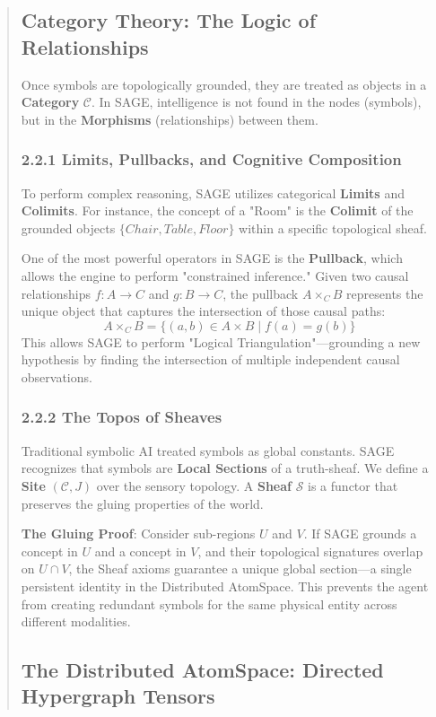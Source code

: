\documentclass[10pt,twocolumn,letterpaper]{article}
\begin{document}
\begin{abstract}
\subsection{Category Theory: The Logic of Relationships}

Once symbols are topologically grounded, they are treated as objects in a \textbf{Category} $\mathcal{C}$. In SAGE, intelligence is not found in the nodes (symbols), but in the \textbf{Morphisms} (relationships) between them.

\subsubsection{2.2.1 Limits, Pullbacks, and Cognitive Composition}
To perform complex reasoning, SAGE utilizes categorical \textbf{Limits} and \textbf{Colimits}. For instance, the concept of a "Room" is the \textbf{Colimit} of the grounded objects $\{Chair, Table, Floor\}$ within a specific topological sheaf.

One of the most powerful operators in SAGE is the \textbf{Pullback}, which allows the engine to perform "constrained inference." Given two causal relationships $f: A \to C$ and $g: B \to C$, the pullback $A \times_C B$ represents the unique object that captures the intersection of those causal paths:
$$ A \times_C B = \{ (a, b) \in A \times B \mid f(a) = g(b) \} $$
This allows SAGE to perform "Logical Triangulation"—grounding a new hypothesis by finding the intersection of multiple independent causal observations.

\subsubsection{2.2.2 The Topos of Sheaves}
Traditional symbolic AI treated symbols as global constants. SAGE recognizes that symbols are \textbf{Local Sections} of a truth-sheaf. We define a \textbf{Site} $(\mathcal{C}, J)$ over the sensory topology. A \textbf{Sheaf} $\mathcal{S}$ is a functor that preserves the gluing properties of the world.

\textbf{The Gluing Proof}: Consider sub-regions $U$ and $V$. If SAGE grounds a concept in $U$ and a concept in $V$, and their topological signatures overlap on $U \cap V$, the Sheaf axioms guarantee a unique global section—a single persistent identity in the Distributed AtomSpace. This prevents the agent from creating redundant symbols for the same physical entity across different modalities.

\subsection{The Distributed AtomSpace: Directed Hypergraph Tensors}


\end{abstract}
\end{document}
